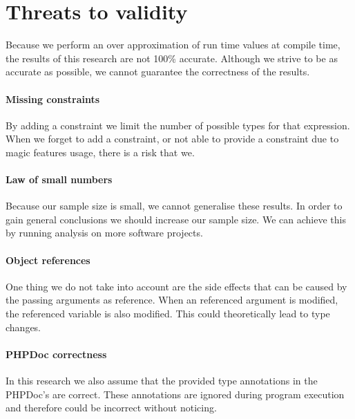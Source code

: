 \documentclass[main.tex]{subfiles}
\begin{document}
    \section{Threats to validity}	
    Because we perform an over approximation of run time values at compile time, the results of this research are not 100\% accurate.
	Although we strive to be as accurate as possible, we cannot guarantee the correctness of the results.
		
	\paragraph{Missing constraints}
	By adding a constraint we limit the number of possible types for that expression.
	When we forget to add a constraint, or not able to provide a constraint due to magic features usage, there is a risk that we.
	
	\paragraph{Law of small numbers}
	Because our sample size is small, we cannot generalise these results.
	In order to gain general conclusions we should increase our sample size.
	We can achieve this by running analysis on more software projects.
	
	\paragraph{Object references}
	One thing we do not take into account are the side effects that can be caused by the passing arguments as reference.
	When an referenced argument is modified, the referenced variable is also modified.
	This could theoretically lead to type changes.
	
	\paragraph{PHPDoc correctness}
	In this research we also assume that the provided type annotations in the PHPDoc's are correct.
	These annotations are ignored during program execution and therefore could be incorrect without noticing. 

	
\end{document}

